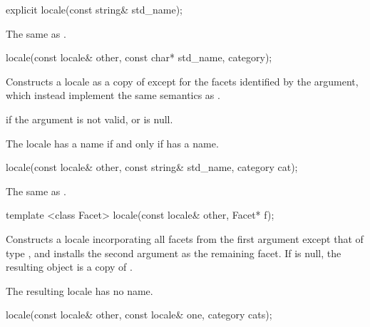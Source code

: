 %
\begin{itemdecl}
explicit locale(const string& std_name);
\end{itemdecl}

\begin{itemdescr}
\pnum
\effects The same as .
\end{itemdescr}

%
\begin{itemdecl}
locale(const locale& other, const char* std_name, category);
\end{itemdecl}

\begin{itemdescr}
\pnum
\effects
Constructs a locale as a copy of
except for the facets identified by the
argument, which instead implement the same semantics as
.

\pnum
\throws
{}
if the argument is not valid, or is null.

\pnum
\remarks
The locale has a name if and only if
has a name.
\end{itemdescr}

%
\begin{itemdecl}
locale(const locale& other, const string& std_name, category cat);
\end{itemdecl}

\begin{itemdescr}
\pnum
\effects The same as .
\end{itemdescr}

%
\begin{itemdecl}
template <class Facet> locale(const locale& other, Facet* f);
\end{itemdecl}

\begin{itemdescr}
\pnum
\effects
Constructs a locale incorporating all facets from the first
argument except that of type
,
and installs the second argument as the remaining facet.
If 
is null, the resulting object is a copy of .

\pnum
\remarks
The resulting locale has no name.
\end{itemdescr}

%
\begin{itemdecl}
locale(const locale& other, const locale& one, category cats);
\end{itemdecl}

